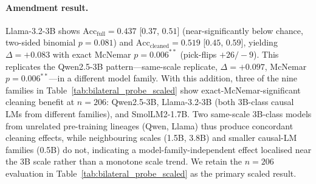 \paragraph{Amendment result.} Llama-3.2-3B shows
$\text{Acc}_\text{full}=0.437$ [$0.37$, $0.51$] (near-significantly
below chance, two-sided binomial $p=0.081$) and
$\text{Acc}_\text{cleaned}=0.519$ [$0.45$, $0.59$], yielding
$\Delta=+0.083$ with exact McNemar $p=0.006^{**}$ (pick-flips
$+26/-9$). This replicates the Qwen2.5-3B pattern---same-scale
replicate, $\Delta=+0.097$, McNemar $p=0.006^{**}$---in a different
model family. With this addition, three of the nine families in
Table~\ref{tab:bilateral_probe_scaled} show exact-McNemar-significant
cleaning benefit at $n=206$: Qwen2.5-3B, Llama-3.2-3B (both
$3$B-class causal LMs from different families), and SmolLM2-1.7B.
Two same-scale $3$B-class models from unrelated pre-training lineages
(Qwen, Llama) thus produce concordant cleaning effects, while
neighbouring scales (1.5B, 3.8B) and smaller causal-LM families
(0.5B) do not, indicating a model-family-independent effect
localised near the $3$B scale rather than a monotone scale trend.
We retain the $n=206$ evaluation in
Table~\ref{tab:bilateral_probe_scaled} as the primary scaled result.


%
%
